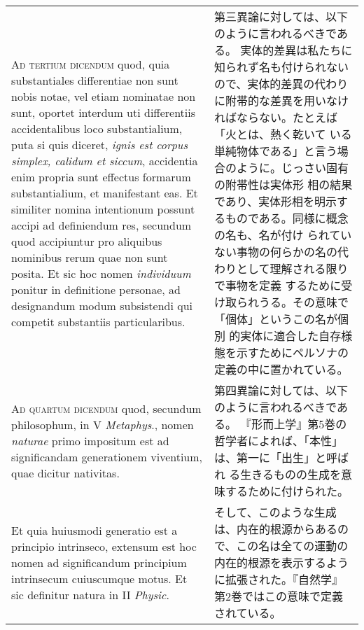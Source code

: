 \documentclass[10pt]{jsarticle} %
\begin{document}
\begin{longtable}{p{21em}p{21em}}
{\scshape Ad tertium dicendum} quod, quia substantiales differentiae non sunt nobis
notae, vel etiam nominatae non sunt, oportet interdum uti differentiis
accidentalibus loco substantialium, puta si quis diceret, {\itshape ignis est
corpus simplex, calidum et siccum}, accidentia enim propria sunt effectus
formarum substantialium, et manifestant eas. Et similiter nomina
intentionum possunt accipi ad definiendum res, secundum quod accipiuntur
pro aliquibus nominibus rerum quae non sunt posita. Et sic hoc nomen
{\itshape individuum} ponitur in definitione personae, ad designandum modum
subsistendi qui competit substantiis particularibus.


&

第三異論に対しては、以下のように言われるべきである。
実体的差異は私たちに知られず名も付けられないので、実体的差異の代わり
 に附帯的な差異を用いなければならない。たとえば「火とは、熱く乾いて
 いる単純物体である」と言う場合のように。じっさい固有の附帯性は実体形
 相の結果であり、実体形相を明示するものである。同様に概念の名も、名が付け
 られていない事物の何らかの名の代わりとして理解される限りで事物を定義
 するために受け取られうる。その意味で「個体」というこの名が個別
 的実体に適合した自存様態を示すためにペルソナの定義の中に置かれている。


\\



{\scshape Ad quartum dicendum} quod, secundum philosophum, in V {\itshape Metaphys}., nomen
{\itshape naturae} primo impositum est ad significandam generationem viventium,
quae dicitur nativitas. 


&

第四異論に対しては、以下のように言われるべきである。
『形而上学』第5巻の哲学者によれば、「本性」は、第一に「出生」と呼ばれ
 る生きるものの生成を意味するために付けられた。




\\


Et quia huiusmodi generatio est a principio
intrinseco, extensum est hoc nomen ad significandum principium
intrinsecum cuiuscumque motus. Et sic definitur natura in II {\itshape Physic}.


&

そして、このような生成は、内在的根源からあるので、この名は全ての運動の
 内在的根源を表示するように拡張された。『自然学』第2巻ではこの意味で定義されている。


\\



\end{longtable}
\end{document}
